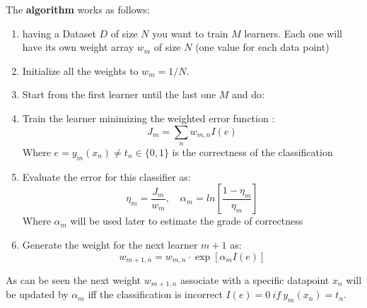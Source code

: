The \textbf{algorithm} works as follows:
\begin{enumerate}
\item having a Dataset $D$ of size $N$ you want to train $M$ learners. Each one will have its own weight array $w_m$ of size $N$ (one value for each data point)
\item Initialize all the weights to  $w_m=1/N$.
\item Start from the first learner until the last one $M$ and do:
\item Train the learner minimizing the weighted error function :
$$J_m=\sum_n w_{m,n}I(e)$$
Where $e=y_m(x_n) \ne t_n \in \{0,1\}$ is the correctness of the classification
\item Evaluate the error for this classifier as:
$$\eta_m=\frac{J_m}{w_m},\quad \alpha_m=ln[\frac{1-\eta_m}{\eta_m}]$$
Where $\alpha_m$ will be used later to estimate the grade of correctness

\item Generate the weight for the next learner $m+1$ as:
$$w_{m+1,n}=w_{m,n}\cdot \exp[\alpha_m I(e)]$$
\end{enumerate}
As can be seen the next weight $w_{m+1,n}$ associate with a specific datapoint $x_n$ will be updated by $\alpha_m$ iff the classification is incorrect $ I(e)=0\ if\ y_m(x_n) = t_n$.